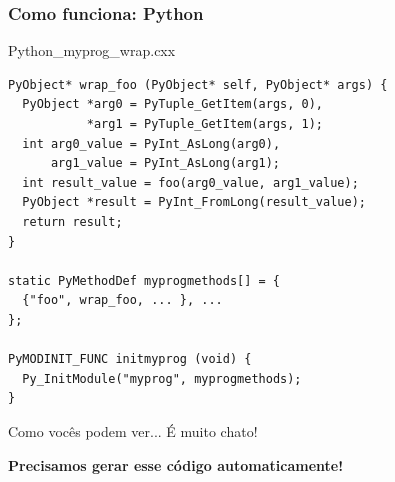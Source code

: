 \documentclass[brazil]{beamer}
\begin{document}
\begin{frame}[fragile]
  \frametitle{Como funciona: Python}
  \pause
  \begin{block}{Python\_myprog\_wrap.cxx}
    \begin{lstlisting}
PyObject* wrap_foo (PyObject* self, PyObject* args) {
  PyObject *arg0 = PyTuple_GetItem(args, 0),
           *arg1 = PyTuple_GetItem(args, 1);
  int arg0_value = PyInt_AsLong(arg0),
      arg1_value = PyInt_AsLong(arg1);
  int result_value = foo(arg0_value, arg1_value);
  PyObject *result = PyInt_FromLong(result_value);
  return result;
}

static PyMethodDef myprogmethods[] = {
  {"foo", wrap_foo, ... }, ...
};

PyMODINIT_FUNC initmyprog (void) {
  Py_InitModule("myprog", myprogmethods);
}
    \end{lstlisting}
  \end{block}
\end{frame}
\begin{frame}[fragile]
  \begin{center}
    Como vocês podem ver... \pause É muito chato!
  \end{center}
  \pause
  \begin{center}
    \textbf{Precisamos gerar esse código automaticamente!}
  \end{center}
\end{frame}
\end{document}

